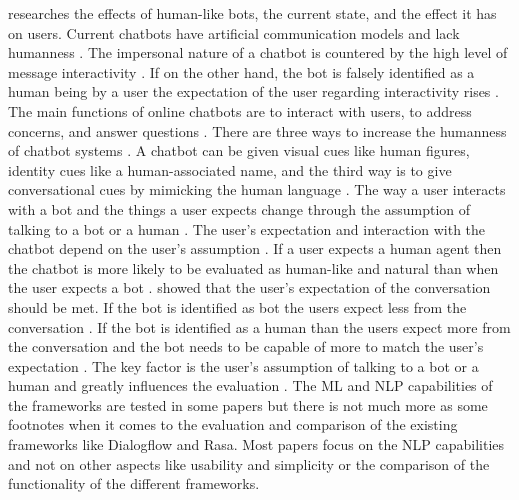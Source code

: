 \citet{GO2019304} researches the effects of human-like bots, the current state, and the 
effect it has on users.
Current chatbots have artificial communication models and lack humanness \citet{GO2019304}.
The impersonal nature of a chatbot is countered by the high level of message interactivity \cite{GO2019304}.
If on the other hand, the bot is falsely identified as a human being by a user the expectation of the user regarding interactivity rises \cite{GO2019304}.
The main functions of online chatbots are to interact with users, to address concerns, and answer questions \cite{GO2019304}. 
There are three ways to increase the humanness of chatbot systems \cite{GO2019304}.
A chatbot can be given visual cues like human figures, identity cues like a human-associated name, and the third way is to 
give conversational cues by mimicking the human language \cite{GO2019304}.
The way a user interacts with a bot and the things a user expects change through the assumption of talking to a bot or a human \cite{GO2019304}.
The user's expectation and interaction with the chatbot depend on the user's assumption \citet{sundar2016theoretical, GO2019304}.
If a user expects a human agent then the chatbot is more likely to be evaluated as human-like and natural than when the user expects a bot \cite{sundar2016theoretical}.
\citet{GO2019304} showed that the user's expectation of the conversation should be met.
If the bot is identified as bot the users expect less from the conversation \cite{GO2019304}.
If the bot is identified as a human than the users expect more from the conversation and the bot needs to be capable of more 
to match the user's expectation \citet{GO2019304}.
The key factor is the user's assumption of talking to a bot or a human and greatly influences the evaluation \cite{GO2019304}.
The ML and NLP capabilities of the frameworks are tested in some papers but there is not much more as some footnotes when it comes to the evaluation and comparison of the existing frameworks like Dialogflow and Rasa.
Most papers focus on the NLP capabilities and not on other aspects like usability and simplicity or the comparison of the functionality of the different frameworks.
